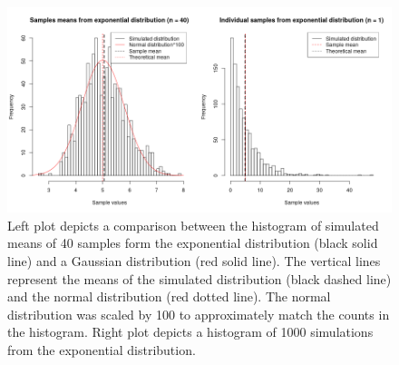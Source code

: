 \documentclass[a4paper,12pt]{article}
\begin{document}
\begin{figure}[!h]
\centering
\includegraphics[width=\textwidth]{Means.png}
\caption{ \label{fig:CLT}
Left plot depicts  a comparison between the histogram of simulated means of 40 samples form the exponential distribution (black solid line) and a Gaussian distribution (red solid line). The vertical lines represent the means of the simulated distribution (black dashed line) and the normal distribution (red dotted line). The normal distribution was scaled by 100 to approximately match the counts in the histogram. Right plot depicts a histogram of 1000 simulations from the exponential distribution.}
\end{figure}
\end{document}
